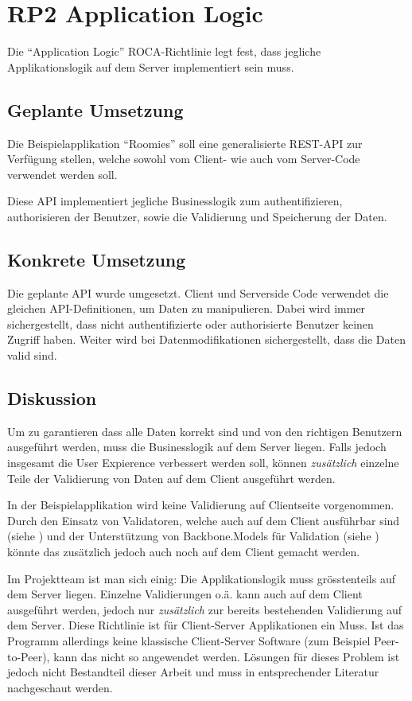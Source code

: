 \section{RP2 Application Logic}
\label{sec:principle-rp2-application-logic}

Die ``Application Logic'' ROCA-Richtlinie legt fest, dass jegliche Applikationslogik auf dem Server implementiert sein muss.

\subsection*{Geplante Umsetzung}

Die Beispielapplikation ``Roomies'' soll eine generalisierte REST-API zur Verfügung stellen, welche sowohl vom Client- wie auch vom Server-Code verwendet werden soll.

Diese API implementiert jegliche Businesslogik zum authentifizieren, authorisieren der Benutzer, sowie die Validierung und Speicherung der Daten.

\subsection*{Konkrete Umsetzung}
Die geplante API wurde umgesetzt. Client und Serverside Code verwendet die gleichen API-Definitionen, um Daten zu manipulieren. Dabei wird immer sichergestellt, dass nicht authentifizierte oder authorisierte Benutzer keinen Zugriff haben.
Weiter wird bei Datenmodifikationen sichergestellt, dass die Daten valid sind.

\subsection*{Diskussion}
Um zu garantieren dass alle Daten korrekt sind und von den richtigen Benutzern ausgeführt werden, muss die Businesslogik auf dem Server liegen.
Falls jedoch insgesamt die User Expierence verbessert werden soll, können \emph{zusätzlich} einzelne Teile der Validierung von Daten auf dem Client ausgeführt werden.

In der Beispielapplikation wird keine Validierung auf Clientseite vorgenommen. Durch den Einsatz von Validatoren, welche auch auf dem Client ausführbar sind (siehe \cite{nodevalidator}) und der Unterstützung von Backbone.Models für Validation (siehe \cite{BackboneModelValidation}) könnte das zusätzlich jedoch auch noch auf dem Client gemacht werden.

Im Projektteam ist man sich einig: Die Applikationslogik muss grösstenteils auf dem Server liegen. Einzelne Validierungen o.ä. kann auch auf dem Client ausgeführt werden, jedoch nur \emph{zusätzlich} zur bereits bestehenden Validierung auf dem Server.
Diese Richtlinie ist für Client-Server Applikationen ein Muss. Ist das Programm allerdings keine klassische Client-Server Software (zum Beispiel Peer-to-Peer), kann das nicht so angewendet werden. Lösungen für dieses Problem ist jedoch nicht Bestandteil dieser Arbeit und muss in entsprechender Literatur nachgeschaut werden.

